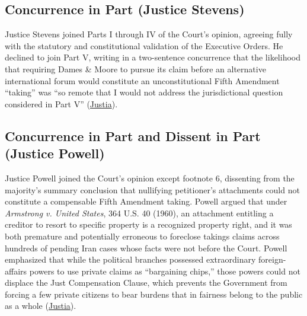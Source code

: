 \documentclass[12pt]{article}
\begin{document}
\subsection{Concurrence in Part (Justice Stevens)}
Justice Stevens joined Parts I through IV of the Court's opinion, agreeing fully with the statutory and constitutional validation of the Executive Orders. He declined to join Part V, writing in a two-sentence concurrence that the likelihood that requiring Dames \& Moore to pursue its claim before an alternative international forum would constitute an unconstitutional Fifth Amendment ``taking'' was ``so remote that I would not address the jurisdictional question considered in Part V'' (\href{https://supreme.justia.com/cases/federal/us/453/654/}{Justia}).

\subsection{Concurrence in Part and Dissent in Part (Justice Powell)}
Justice Powell joined the Court's opinion except footnote 6, dissenting from the majority's summary conclusion that nullifying petitioner's attachments could not constitute a compensable Fifth Amendment taking. Powell argued that under \textit{Armstrong v. United States}, 364 U.S. 40 (1960), an attachment entitling a creditor to resort to specific property is a recognized property right, and it was both premature and potentially erroneous to foreclose takings claims across hundreds of pending Iran cases whose facts were not before the Court. Powell emphasized that while the political branches possessed extraordinary foreign-affairs powers to use private claims as ``bargaining chips,'' those powers could not displace the Just Compensation Clause, which prevents the Government from forcing a few private citizens to bear burdens that in fairness belong to the public as a whole (\href{https://supreme.justia.com/cases/federal/us/453/654/}{Justia}).
\end{document}

